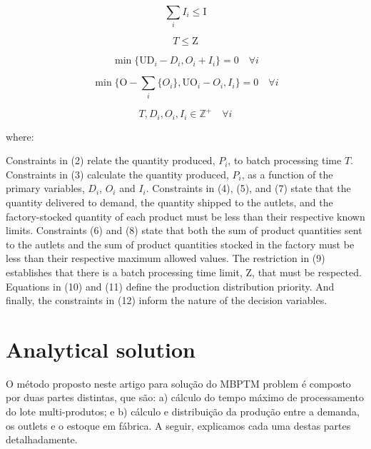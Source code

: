 \documentclass[authoryear,manuscript,12pt]{elsarticle}
\begin{document}
\begin{equation}
\sum_i{I_i} \leq \textrm{I}
\end{equation}

\begin{equation}
T \leq \textrm{Z}
\end{equation}

\begin{equation}
\min \{\textrm{UD}_i - D_i, O_i + I_i\} = 0 \quad \forall i
\end{equation}

\begin{equation}
\min\{\textrm{O} - \sum_i\{ O_i\}, \textrm{UO}_i - O_i, I_i\} = 0 \quad \forall i
\end{equation}

\begin{equation}
\label{MBPTMP10}
T, D_i, O_i, I_i \in  \mathbb{Z}^+ \quad \forall i
\end{equation}

where:

Constraints in (2) relate the quantity produced, $P_i$, to batch processing time $T$. Constraints in (3) calculate the quantity produced, $P_i$, as a function of the primary variables, $D_i$, $O_i$ and $I_i$. Constraints in (4), (5), and (7) state that the quantity delivered to demand, the quantity shipped to the autlets, and the factory-stocked quantity of each product must be less than their respective known limits. Constraints (6) and (8) state that both the sum of product quantities sent to the autlets and the sum of product quantities stocked in the factory must be less than their respective maximum allowed values. The restriction in (9) establishes that there is a batch processing time limit, $\textrm{Z}$, that must be respected. Equations in (10) and (11) define the production distribution priority. And finally, the constraints in (12) inform the nature of the decision variables.

\section{Analytical solution}
\label{sec:analyticalSol}

O método proposto neste artigo para solução do MBPTM problem é composto por duas partes distintas, que são: a) cálculo do tempo máximo de processamento do lote multi-produtos; e b) cálculo e distribuição da produção entre a demanda, os outlets e o estoque em fábrica. A seguir, explicamos cada uma destas partes detalhadamente. 
\end{document}
